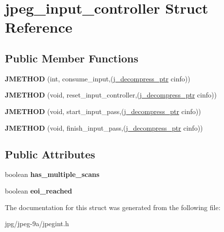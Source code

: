 \hypertarget{structjpeg__input__controller}{\section{jpeg\+\_\+input\+\_\+controller Struct Reference}
\label{structjpeg__input__controller}
}
\subsection*{Public Member Functions}
\begin{DoxyCompactItemize}
\item 
\hypertarget{structjpeg__input__controller_af742c796479db5dd8b3275307d76a103}{{\bfseries J\+M\+E\+T\+H\+O\+D} (int, consume\+\_\+input,(\hyperlink{structjpeg__decompress__struct}{j\+\_\+decompress\+\_\+ptr} cinfo))}\label{structjpeg__input__controller_af742c796479db5dd8b3275307d76a103}

\item 
\hypertarget{structjpeg__input__controller_aa2720adb6f991abedb2e8c03804cac4f}{{\bfseries J\+M\+E\+T\+H\+O\+D} (void, reset\+\_\+input\+\_\+controller,(\hyperlink{structjpeg__decompress__struct}{j\+\_\+decompress\+\_\+ptr} cinfo))}\label{structjpeg__input__controller_aa2720adb6f991abedb2e8c03804cac4f}

\item 
\hypertarget{structjpeg__input__controller_aef985c09924396a078c67592da47d679}{{\bfseries J\+M\+E\+T\+H\+O\+D} (void, start\+\_\+input\+\_\+pass,(\hyperlink{structjpeg__decompress__struct}{j\+\_\+decompress\+\_\+ptr} cinfo))}\label{structjpeg__input__controller_aef985c09924396a078c67592da47d679}

\item 
\hypertarget{structjpeg__input__controller_a70620c8e0ea8fd2f7b0243cd9bf395e1}{{\bfseries J\+M\+E\+T\+H\+O\+D} (void, finish\+\_\+input\+\_\+pass,(\hyperlink{structjpeg__decompress__struct}{j\+\_\+decompress\+\_\+ptr} cinfo))}\label{structjpeg__input__controller_a70620c8e0ea8fd2f7b0243cd9bf395e1}

\end{DoxyCompactItemize}
\subsection*{Public Attributes}
\begin{DoxyCompactItemize}
\item 
\hypertarget{structjpeg__input__controller_a6f02f9c18464bfbf30b27f5a43c2665a}{boolean {\bfseries has\+\_\+multiple\+\_\+scans}}\label{structjpeg__input__controller_a6f02f9c18464bfbf30b27f5a43c2665a}

\item 
\hypertarget{structjpeg__input__controller_a8e1c345f356d36f98c2ece4dc21549d7}{boolean {\bfseries eoi\+\_\+reached}}\label{structjpeg__input__controller_a8e1c345f356d36f98c2ece4dc21549d7}

\end{DoxyCompactItemize}


The documentation for this struct was generated from the following file\+:\begin{DoxyCompactItemize}
\item 
jpg/jpeg-\/9a/jpegint.\+h\end{DoxyCompactItemize}
